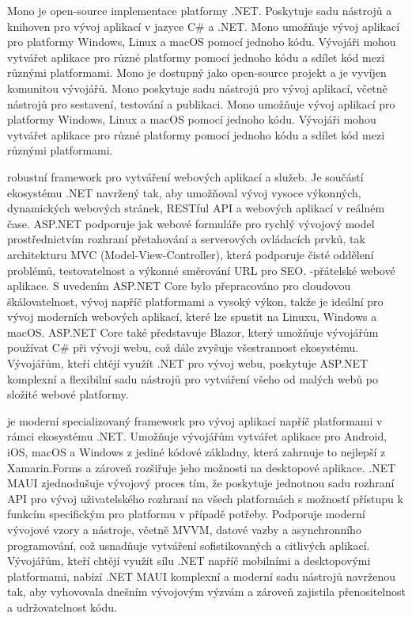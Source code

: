Mono je open-source implementace platformy .NET. Poskytuje sadu nástrojů a knihoven pro vývoj aplikací v jazyce C\# a .NET. Mono umožňuje vývoj aplikací pro platformy Windows, Linux a macOS pomocí jednoho kódu. Vývojáři mohou vytvářet aplikace pro různé platformy pomocí jednoho kódu a sdílet kód mezi různými platformami. Mono je dostupný jako open-source projekt a je vyvíjen komunitou vývojářů. Mono poskytuje sadu nástrojů pro vývoj aplikací, včetně nástrojů pro sestavení, testování a publikaci. Mono umožňuje vývoj aplikací pro platformy Windows, Linux a macOS pomocí jednoho kódu. Vývojáři mohou vytvářet aplikace pro různé platformy pomocí jednoho kódu a sdílet kód mezi různými platformami.



robustní framework pro vytváření webových aplikací a služeb. Je součástí ekosystému .NET navržený tak, aby umožňoval vývoj vysoce výkonných, dynamických webových stránek, RESTful API a webových aplikací v reálném čase. ASP.NET podporuje jak webové formuláře pro rychlý vývojový model prostřednictvím rozhraní přetahování a serverových ovládacích prvků, tak architekturu MVC (Model-View-Controller), která podporuje čisté oddělení problémů, testovatelnost a výkonné směrování URL pro SEO. -přátelské webové aplikace. S uvedením ASP.NET Core bylo přepracováno pro cloudovou škálovatelnost, vývoj napříč platformami a vysoký výkon, takže je ideální pro vývoj moderních webových aplikací, které lze spustit na Linuxu, Windows a macOS. ASP.NET Core také představuje Blazor, který umožňuje vývojářům používat C\# při vývoji webu, což dále zvyšuje všestrannost ekosystému. Vývojářům, kteří chtějí využít .NET pro vývoj webu, poskytuje ASP.NET komplexní a flexibilní sadu nástrojů pro vytváření všeho od malých webů po složité webové platformy.


je moderní specializovaný framework pro vývoj aplikací napříč platformami v rámci ekosystému .NET. Umožňuje vývojářům vytvářet aplikace pro Android, iOS, macOS a Windows z jediné kódové základny, která zahrnuje to nejlepší z Xamarin.Forms a zároveň rozšiřuje jeho možnosti na desktopové aplikace. .NET MAUI zjednodušuje vývojový proces tím, že poskytuje jednotnou sadu rozhraní API pro vývoj uživatelského rozhraní na všech platformách s možností přístupu k funkcím specifickým pro platformu v případě potřeby. Podporuje moderní vývojové vzory a nástroje, včetně MVVM, datové vazby a asynchronního programování, což usnadňuje vytváření sofistikovaných a citlivých aplikací. Vývojářům, kteří chtějí využít sílu .NET napříč mobilními a desktopovými platformami, nabízí .NET MAUI komplexní a moderní sadu nástrojů navrženou tak, aby vyhovovala dnešním vývojovým výzvám a zároveň zajistila přenositelnost a udržovatelnost kódu.

